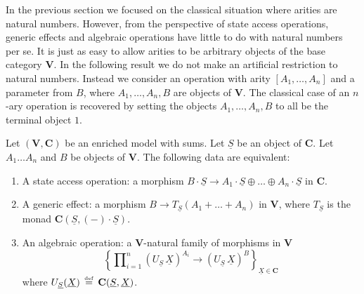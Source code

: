 \documentclass{LMCS}
\newcommand{\comptype}[1]{\underline{#1}}
\newcommand{\algX}{{\comptype{X}}}
\newcommand{\algplus}{\oplus}
\DeclareMathOperator{\Prod}{\textstyle{\prod}}
\newcommand{\VCat}{\fixedcatfont{V}} \newcommand{\CCat}{\fixedcatfont{C}} \newcommand{\DCat}{\fixedcatfont{D}}
\newcommand{\ltensor}[2]{#1 \cdot #2}
\newcommand{\fixedcatfont}{\mathbf}
\newcommand{\stateobj}{{\underline{S}}}
\newcommand{\defeq}{\mathrel{\,\stackrel{\mbox{\tiny{$\mathrm{def}$}}}=\,}}
\begin{document}
In the previous section we focused on the classical situation
where arities are natural numbers.
However, from the perspective of 
state access operations, generic effects and algebraic operations
have little to do with
natural numbers per se.
It is just as easy to allow arities to be arbitrary 
objects of the base category $\VCat$.
In the following result we do not make an artificial 
restriction to natural numbers. Instead we consider an operation 
with arity $[A_1,\dots,A_n]$ and a parameter from $B$,
where $A_1,\dots,A_n,B$ are objects of $\VCat$.
The classical case of an $n$-ary operation is recovered 
by setting the objects $A_1,\dots,A_n,B$ to all be the terminal object $1$.
\begin{thm}
\label{thm:stateaccess-geneff-algop}
Let $(\VCat,\CCat)$ be an enriched model with sums. Let $\stateobj$ be an object
of $\CCat$. Let $A_1\dots A_n$ and $B$ be objects of $\VCat$.
The following data are equivalent:
\begin{enumerate}
\item A state access operation:
a morphism $\ltensor B \stateobj\to 
\ltensor{A_1}\stateobj
\algplus\dots\algplus\ltensor{A_n}\stateobj$ 
in $\CCat$.
\item A generic effect:
a morphism $B\to T_\stateobj(A_1+\dots+A_n)$ in $\VCat$,
where ${T_\stateobj}$ is the monad
${\CCat(\stateobj,\ltensor {(-)}\stateobj)}$.
\item An algebraic operation:
a $\VCat$-natural family of morphisms in $\VCat$
\[\left\{\Prod_{i=1}^n {(U_\stateobj\,\algX)^{A_i}}\to (U_\stateobj\,\algX)^{B}\right\}_{\algX\in\CCat}\]
where $U_\stateobj(\algX)\defeq \CCat(\stateobj,\algX)$.
\end{enumerate}
\end{thm}
\end{document}
